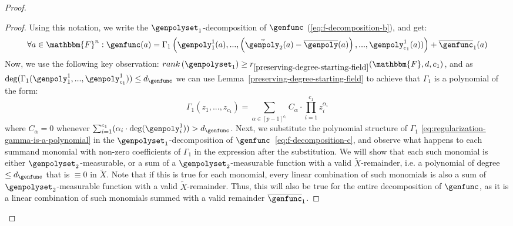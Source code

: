 \documentclass[10pt,a4paper]{article}
\newcommand{\parens}[1]{\left( #1 \right)}
\newcommand{\sparens}[1]{\left[ #1 \right]}
\newcommand{\basefield}[0]{\mathbbm{F}}
\newcommand{\blocklength}[0]{n}
\newcommand{\field}[0]{\basefield^{\blocklength}}
\newcommand{\degree}[0]{d}
\newcommand{\basefieldsize}[0]{p}
\newcommand{\relativeremainder}[1]{\overline{#1}}
\newcommand{\variety}{{\tilde{X}}}
\newcommand{\rank}[1]{rank \parens{#1}}
\newcommand{\rankfunc}[0]{{{{r}}}}
\begin{document}
\begin{proof}
\begin{proof}
        Using this notation, we write the $\genpolyset_1$-decomposition of $\genfunc$ (\ref{eq:f-decomposition-b}), and get:
        \begin{equation} \label{eq:f-decomposition-c}
            \forall a \in \field: \genfunc(a) = \Gamma_1 \parens
            {\genpoly^{1}_{1}(a)
                ,...,
                \parens{
                    \vec{\genpoly}_2(a)
                    - \relativeremainder{\genpoly}(a)}
                ,...,
                \genpoly^{1}_{c_1}(a))}
            + \relativeremainder{\genfunc}_1(a)
        \end{equation}
        Now, we use the following key observation:
        $\rank{\genpolyset_1} \geq \rankfunc_{\ref{preserving-degree-starting-field}}(\basefield, \degree, c_1)$,
        and as $\deg(\Gamma_1(\genpoly_1^1,...,\genpoly^1_{c_1})) \leq \degree_{\genfunc}$
        we can use Lemma~\ref{preserving-degree-starting-field} to achieve that $\Gamma_1$ is a polynomial of the form:
        \begin{equation*} \label{eq:regularization-gamma-is-a-polynomial}
            \Gamma_1(z_1,...,z_{c_1})  =
            \sum_{\alpha \in \sparens{\basefieldsize - 1}^{c_1}}
            {C_{\alpha} \cdot {\prod_{i = 1}^{c_1}}{z_i^{\alpha_i}}}
        \tag{$\star$}
        \end{equation*}
        where $C_{\alpha} = 0$ whenever $\sum_{i = 1}^{c_1}(\alpha_i \cdot \deg(\genpoly_i^1)) > \degree_{\genfunc}$.
        \newline
        Next, we substitute the polynomial structure of $\Gamma_1$ \eqref{eq:regularization-gamma-is-a-polynomial}
        in the $\genpolyset_1$-decomposition of $\genfunc$~\eqref{eq:f-decomposition-c},
        and observe what happens to each summand monomial with non-zero coefficients of $\Gamma_1$ in the expression after the substitution.
        \newline
        We will show that each such monomial is either $\genpolyset_2$-measurable,
        or a sum of a $\genpolyset_2$-measurable function with a valid $\variety$-remainder, i.e. a polynomial of degree $\leq \degree_{\genfunc}$ that is $\equiv 0$ in $\variety$.
        Note that if this is true for each monomial,
        every linear combination of such monomials is also a sum of $\genpolyset_2$-measurable function with a valid $\variety$-remainder.
        Thus, this will also be true for the entire decomposition of $\genfunc$, as it is a linear combination of such monomials summed with a valid remainder $\relativeremainder{\genfunc}_1$.

\end{proof}
\end{proof}
\end{document}
